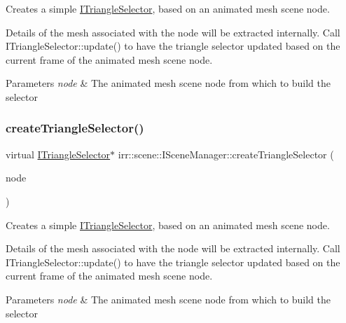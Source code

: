 Creates a simple \hyperlink{classirr_1_1scene_1_1ITriangleSelector}{I\+Triangle\+Selector}, based on an animated mesh scene node. 

Details of the mesh associated with the node will be extracted internally. Call I\+Triangle\+Selector\+::update() to have the triangle selector updated based on the current frame of the animated mesh scene node. 
\begin{DoxyParams}{Parameters}
{\em node} & The animated mesh scene node from which to build the selector \\
\hline
\end{DoxyParams}
\mbox{\label{classirr_1_1scene_1_1ISceneManager_abc1ecc9a60abb40e7ffddbd72c077231}} 
\subsubsection{\texorpdfstring{create\+Triangle\+Selector()}{createTriangleSelector()}\hspace{0.1cm}{\footnotesize\ttfamily [4/4]}}
{\footnotesize\ttfamily virtual \hyperlink{classirr_1_1scene_1_1ITriangleSelector}{I\+Triangle\+Selector}$\ast$ irr\+::scene\+::\+I\+Scene\+Manager\+::create\+Triangle\+Selector (\begin{DoxyParamCaption}\item[{\hyperlink{classirr_1_1scene_1_1IAnimatedMeshSceneNode}{I\+Animated\+Mesh\+Scene\+Node} $\ast$}]{node }\end{DoxyParamCaption})\hspace{0.3cm}{\ttfamily [pure virtual]}}



Creates a simple \hyperlink{classirr_1_1scene_1_1ITriangleSelector}{I\+Triangle\+Selector}, based on an animated mesh scene node. 

Details of the mesh associated with the node will be extracted internally. Call I\+Triangle\+Selector\+::update() to have the triangle selector updated based on the current frame of the animated mesh scene node. 
\begin{DoxyParams}{Parameters}
{\em node} & The animated mesh scene node from which to build the selector \\
\hline
\end{DoxyParams}
\mbox{\label{classirr_1_1scene_1_1ISceneManager_adb717113b4203e92f2bd95c84488059c}} 

